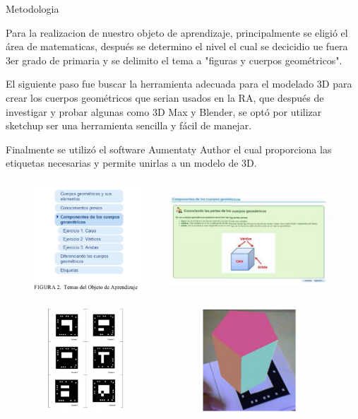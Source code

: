 \documentclass[11pt]{beamer}
\begin{document}
\begin{frame}{Metodologia}

Para la realizacion de nuestro objeto de aprendizaje, principalmente se eligió el área de matematicas, después se determino el nivel el cual se decicidio ue fuera 3er grado de primaria y se delimito el tema a "figuras y cuerpos geométricos".

El siguiente paso fue buscar la herramienta adecuada para el modelado 3D para crear los cuerpos geométricos que serian usados en la RA, que después de investigar y probar algunas como 3D Max y Blender, se optó por utilizar sketchup ser una herramienta sencilla y fácil de manejar.

Finalmente se utilizó el software Aumentaty Author el cual proporciona las etiquetas necesarias y permite unirlas a un modelo de 3D.
\end{frame}

\begin{frame}
\frametitle{}
\center 
\includegraphics[width=6cm, height=4cm]{img/imagen2.png}
\includegraphics[width=6cm, height=4cm]{img/imagen3.png}

\end{frame}

\begin{frame}
\center 
\includegraphics[width=6cm, height=4cm]{img/imagen4.png}
\includegraphics[width=6cm, height=4cm]{img/imagen5.png}

\end{frame}
\end{document}
